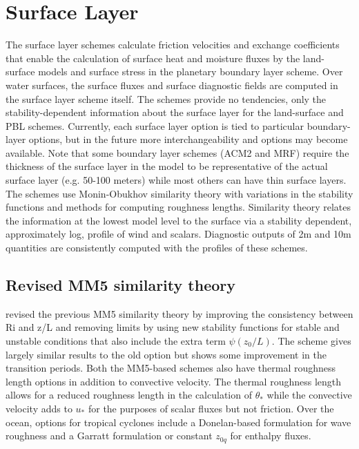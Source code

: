 \section{Surface Layer}

The surface layer schemes calculate friction velocities and exchange 
coefficients that enable the calculation of surface heat and moisture 
fluxes by the land-surface models and surface stress in the planetary 
boundary layer scheme. Over water surfaces, the surface fluxes and surface 
diagnostic fields are computed in the surface layer scheme itself. The schemes 
provide no tendencies, only the stability-dependent information about 
the surface layer for the land-surface and PBL schemes.
Currently, each surface layer option is tied to particular boundary-layer
options, but in the future more interchangeability and options may become
available. Note that some boundary layer schemes (ACM2 and MRF) require
the thickness of the surface layer in the model to be representative of the
actual surface layer (e.g. 50-100 meters) while most others can have thin surface
layers. The schemes use Monin-Obukhov similarity theory with variations in
the stability functions and methods for computing roughness lengths.
Similarity theory relates the information at the lowest model level to the
surface via a stability dependent, approximately log, profile of wind and
scalars. Diagnostic outputs of 2m and 10m quantities are consistently
computed with the profiles of these schemes.

\subsection{Revised MM5 similarity theory}

\citet{jimenez12} revised the previous MM5 similarity theory by improving the
consistency between Ri and z/L and removing limits by using new stability
functions for stable and unstable conditions that also include the extra term
$\psi(z_0/L)$. The scheme gives largely similar results to the old option but shows
some improvement in the transition periods. Both the MM5-based schemes
also have thermal roughness length options in addition to convective velocity.
The thermal roughness length allows for a reduced roughness length in 
the calculation of $\theta_*$ while the convective velocity adds to $u_*$
for the purposes of scalar fluxes but not friction. Over the ocean, options
for tropical cyclones include a Donelan-based formulation for wave
roughness and a Garratt formulation or constant $z_{0q}$ for enthalpy fluxes.

